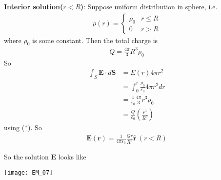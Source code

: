 \documentclass[a4paper]{article}
\begin{document}
\textbf{Interior solution($r<R$)}: Suppose uniform distribution in sphere, i.e.
\begin{equation*}
\begin{aligned}
\rho(r) = \left\{\begin{array}{ll}
\rho_0 & r \leq R\\
0 & r>R
\end{array}\right.
\end{aligned}
\end{equation*}
where $\rho_0$ is some constant. Then the total charge is
\begin{equation*}\tag{*}
\begin{aligned}
Q = \frac{4\pi}{3} R^3 \rho_0
\end{aligned}
\end{equation*}
So
\begin{equation*}
\begin{aligned}
\int_S \mathbf{E} \cdot d\mathbf{S} &= E(r)4\pi r^2\\
&= \int_0^r \frac{\rho_0}{\varepsilon_0} 4\pi r^2 dr\\
&= \frac{1}{\varepsilon_0} \frac{4\pi}{3} r^3 \rho_0\\
&= \frac{Q}{\varepsilon_0} (\frac{r^3}{R^3})
\end{aligned}
\end{equation*}
using (*). So
\begin{equation*}\tag{2.5} \label{eq:2.5}
\begin{aligned}
\mathbf{E}(\mathbf{r}) = \frac{1}{4\pi \varepsilon_0} \frac{Qr}{R^3}\mathbf{\hat{r}} \ (r<R)
\end{aligned}
\end{equation*}

So the solution $\mathbf{E}$ looks like

\texttt{[image: EM\_07]}
\end{document}
